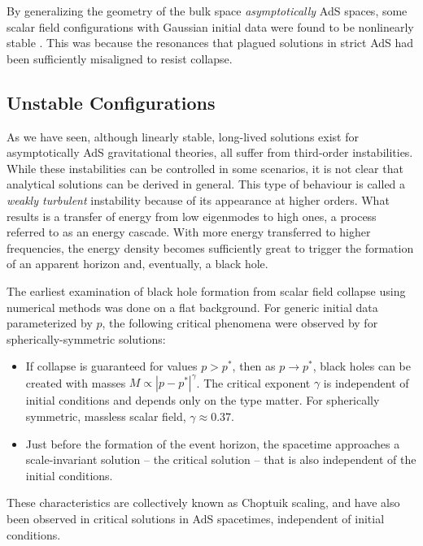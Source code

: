 \documentclass[../PhD.tex]{subfiles}
\begin{document}
By generalizing the geometry of the bulk space \emph{asymptotically} AdS spaces, some scalar field configurations with Gaussian initial data were found to be nonlinearly stable \cite{1208.5772}. This was because the resonances that plagued solutions in strict AdS had been sufficiently misaligned to resist collapse. 

 
\subsection{Unstable Configurations}
\label{sub: numerical}

As we have seen, although linearly stable, long-lived solutions exist for asymptotically AdS gravitational theories, all suffer from third-order instabilities. While these instabilities can be controlled in some scenarios, it is not clear that analytical solutions can be derived in general. This type of behaviour is called a \emph{weakly turbulent} instability because of its appearance at higher orders. What results is a transfer of energy from low eigenmodes to high ones, a process referred to as an energy cascade. With more energy transferred to higher frequencies, the energy density becomes sufficiently great to trigger the formation of an apparent horizon and, eventually, a black hole.

The earliest examination of black hole formation from scalar field collapse using numerical methods was done on a flat background. For generic initial data parameterized by $p$, the following critical phenomena were observed by \cite{Choptuik:1992jv} for spherically-symmetric solutions:
\begin{itemize}
\item If collapse is guaranteed for values $p > p^*$, then as $p \to p^*$, black holes can be created with masses $M \propto |p - p^*|^\gamma$. The critical exponent $\gamma$ is independent of initial conditions and depends only on the type matter. For spherically symmetric, massless scalar field, $\gamma \approx 0.37$.
\item Just before the formation of the event horizon, the spacetime approaches a scale-invariant solution -- the critical solution -- that is also independent of the initial conditions.
\end{itemize}

These characteristics are collectively known as Choptuik scaling, and have also been observed in critical solutions in AdS spacetimes, independent of initial conditions.
\end{document}
